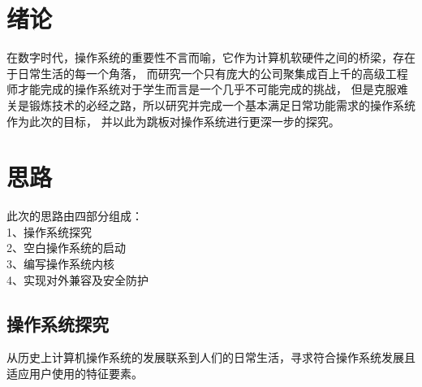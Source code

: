 \documentclass{swfcthesis}
\begin{document}

\makepreliminarypages%
\frontmatter          
\tableofcontents     %
\listoffigures       %
\listoftables        %
\mainmatter

\chapter{绪论}
在数字时代，操作系统的重要性不言而喻，它作为计算机软硬件之间的桥梁，存在于日常生活的每一个角落，
而研究一个只有庞大的公司聚集成百上千的高级工程师才能完成的操作系统对于学生而言是一个几乎不可能完成的挑战，
但是克服难关是锻炼技术的必经之路\cite{30_os}，所以研究并完成一个基本满足日常功能需求的操作系统作为此次的目标，
并以此为跳板对操作系统进行更深一步的探究。

\chapter{思路}

此次的思路由四部分组成：\\
\hspace*{1.5cm}1、操作系统探究 \\
\hspace*{1.5cm}2、空白操作系统的启动 \\
\hspace*{1.5cm}3、编写操作系统内核 \\
\hspace*{1.5cm}4、实现对外兼容及安全防护

\section{操作系统探究}
从历史上计算机操作系统的发展联系到人们的日常生活，寻求符合操作系统发展且适应用户使用的特征要素。
\end{document}
